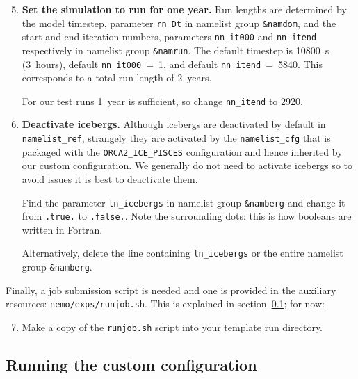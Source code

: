 \begin{enumerate}\setcounter{enumi}{4}

    \item\textbf{Set the simulation to run for one year.}
        Run lengths are determined by the model timestep, parameter \verb|rn_Dt| in namelist group \verb|&namdom|, and the start and end iteration numbers, parameters \verb|nn_it000| and \verb|nn_itend| respectively in namelist group \verb|&namrun|.
        The default timestep is 10800~s (3~hours), default \verb|nn_it000|~=~1, and default \verb|nn_itend|~=~5840.
        This corresponds to a total run length of 2~years.
        
        For our test runs 1~year is sufficient, so change \verb|nn_itend| to 2920.

    \item\textbf{Deactivate icebergs.}
        Although icebergs are deactivated by default in \verb|namelist_ref|, strangely they are activated by the \verb|namelist_cfg| that is packaged with the \verb|ORCA2_ICE_PISCES| configuration and hence inherited by our custom configuration.
        We generally do not need to activate icebergs so to avoid issues it is best to deactivate them.
        
        Find the parameter \verb|ln_icebergs| in namelist group \verb|&namberg| and change it from \verb|.true.| to \verb|.false.|.
        Note the surrounding dots: this is how booleans are written in Fortran.
        
        Alternatively, delete the line containing \verb|ln_icebergs| or the entire namelist group \verb|&namberg|.

\end{enumerate}

Finally, a job submission script is needed and one is provided in the auxiliary resources:  \verb|nemo/exps/runjob.sh|.
This is explained in section~\ref{sec:tutorial:subsec:running-custom}; for now:

\begin{enumerate}\setcounter{enumi}{6}
    \item Make a copy of the \verb|runjob.sh| script into your template run directory.
\end{enumerate}


\subsection{Running the custom configuration}
\label{sec:tutorial:subsec:running-custom}

